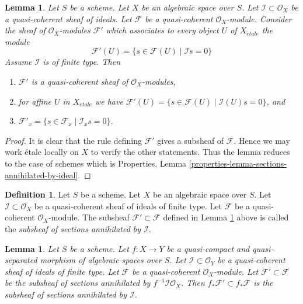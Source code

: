 \documentclass{stacks-project}
\theoremstyle{plain}
\newtheorem{lemma}[subsection]{Lemma}
\theoremstyle{definition}
\newtheorem{definition}[subsection]{Definition}
\theoremstyle{remark}
\numberwithin{equation}{subsection}
\def\etale{{\acute{e}tale}}
\begin{document}
\begin{lemma}
\label{lemma-sections-annihilated-by-ideal}
Let $S$ be a scheme. Let $X$ be an algebraic space over $S$.
Let $\mathcal{I} \subset \mathcal{O}_X$ be a quasi-coherent sheaf of ideals.
Let $\mathcal{F}$ be a quasi-coherent $\mathcal{O}_X$-module.
Consider the sheaf of $\mathcal{O}_X$-modules $\mathcal{F}'$
which associates to every object $U$ of $X_\etale$ the module
$$
\mathcal{F}'(U)
=
\{s \in \mathcal{F}(U) \mid
\mathcal{I}s = 0\}
$$
Assume $\mathcal{I}$ is of finite type. Then
\begin{enumerate}
\item $\mathcal{F}'$ is a quasi-coherent sheaf of $\mathcal{O}_X$-modules,
\item for affine $U$ in $X_\etale$ we have
$\mathcal{F}'(U) = \{s \in \mathcal{F}(U) \mid \mathcal{I}(U)s = 0\}$, and
\item $\mathcal{F}'_x = \{s \in \mathcal{F}_x \mid \mathcal{I}_x s = 0\}$.
\end{enumerate}
\end{lemma}

\begin{proof}
It is clear that the rule defining $\mathcal{F}'$ gives a subsheaf
of $\mathcal{F}$. Hence we may work \'etale locally on $X$ to verify
the other statements. Thus the lemma reduces to the case of schemes
which is
Properties, Lemma \ref{properties-lemma-sections-annihilated-by-ideal}.
\end{proof}

\begin{definition}
\label{definition-subsheaf-sections-annihilated-by-ideal}
Let $S$ be a scheme. Let $X$ be an algebraic space over $S$.
Let $\mathcal{I} \subset \mathcal{O}_X$ be a quasi-coherent
sheaf of ideals of finite type.
Let $\mathcal{F}$ be a quasi-coherent $\mathcal{O}_X$-module.
The subsheaf $\mathcal{F}' \subset \mathcal{F}$ defined in
Lemma \ref{lemma-sections-annihilated-by-ideal} above is called
the {\it subsheaf of sections annihilated by $\mathcal{I}$}.
\end{definition}

\begin{lemma}
\label{lemma-push-sections-annihilated-by-ideal}
Let $S$ be a scheme.
Let $f : X \to Y$ be a quasi-compact and quasi-separated morphism
of algebraic spaces over $S$.
Let $\mathcal{I} \subset \mathcal{O}_Y$ be a quasi-coherent
sheaf of ideals of finite type. Let $\mathcal{F}$ be a quasi-coherent
$\mathcal{O}_X$-module. Let $\mathcal{F}' \subset \mathcal{F}$
be the subsheaf of sections annihilated by $f^{-1}\mathcal{I}\mathcal{O}_X$.
Then $f_*\mathcal{F}' \subset f_*\mathcal{F}$ is the subsheaf
of sections annihilated by $\mathcal{I}$.
\end{lemma}
\end{document}
